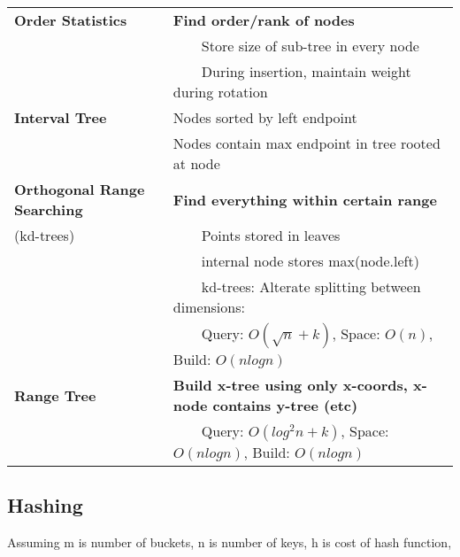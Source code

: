 \documentclass{article}
\newcommand{\tabitem}{~~\llap{\textbullet}~~}
\begin{document}
    \noindent\begin{tabular}{|l|l|}
        \toprule
        \textbf{Order Statistics} & \textbf{Find order/rank of nodes}\\
        & \tabitem Store size of sub-tree in every node\\
        & \tabitem During insertion, maintain weight during rotation\\
        \midrule
        \textbf{Interval Tree} & Nodes sorted by left endpoint\\
        & Nodes contain max endpoint in tree rooted at node\\
        \midrule 
        \textbf{Orthogonal Range Searching} & \textbf{Find everything within certain range}\\
        (kd-trees) & \tabitem Points stored in leaves\\
        & \tabitem internal node stores max(node.left)\\
        & \tabitem kd-trees: Alterate splitting between dimensions:\\
        & \tabitem Query: $O(\sqrt{n} + k)$, Space: $O(n)$, Build: $O(nlogn)$\\
        \midrule
        \textbf{Range Tree} & \textbf{Build x-tree using only x-coords, x-node contains y-tree (etc)}\\
        & \tabitem Query: $O(log^{2}n + k)$, Space: $O(nlogn)$, Build: $O(nlogn)$\\
        \bottomrule 
    \end{tabular}

    \subsection{Hashing}

    Assuming m is number of buckets, n is number of keys, h is cost of hash function,\\
\end{document}
